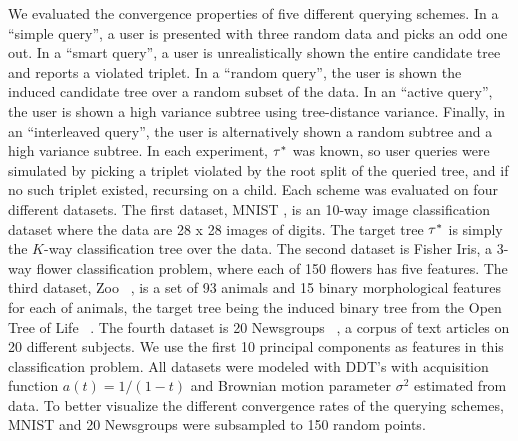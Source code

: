 We evaluated the convergence properties of five different querying schemes.
In a ``simple query'', a user is presented with three random data
and picks an odd one out.
In a ``smart query'', a user is unrealistically shown the entire candidate tree and reports a violated triplet.
In a ``random query'', the user is shown the induced candidate tree over
a random subset of the data.
In an ``active query'', the user is shown a high variance 
subtree using tree-distance variance.
Finally, in an ``interleaved query'', the user is alternatively shown a random
subtree and a high variance subtree.
In each experiment, $\tau^*$ was known, so user queries were simulated
by picking a triplet
violated by the root split of the queried tree, 
and if no such triplet existed, recursing on a child.
Each scheme was evaluated on four different datasets.
The first dataset, MNIST \citep{MNIST}, is an 10-way image classification
dataset where the data are 28 x 28 images of digits.
The target tree $\tau^*$ is simply the $K$-way classification 
tree over the data.
The second dataset is Fisher Iris, a 3-way flower
classification problem, where each of 150 flowers has
five features.
The third dataset, Zoo ~\citep{Lichman2013}, is a set of 93 animals
and 15 binary morphological features for each of animals,
the target tree being the induced binary tree 
from the Open Tree of Life ~\citep{Hinchliff2015}.
The fourth dataset is 20 Newsgroups ~\citep{20News}, a
corpus of text articles on 20 different subjects. We use
the first 10 principal components as features
in this classification problem.
All datasets were modeled with DDT's with
acquisition function $a(t) = 1/(1 - t)$
and Brownian motion parameter $\sigma^2$ estimated from data.
To better visualize the different convergence rates
of the querying schemes, MNIST and  20 Newsgroups were subsampled
to 150 random points.

